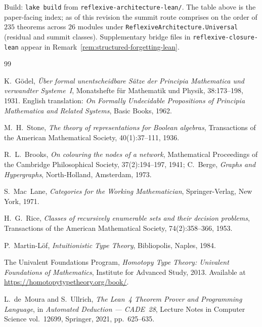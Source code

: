 \documentclass[11pt,a4paper]{article}
\theoremstyle{plain}
\theoremstyle{definition}
\theoremstyle{remark}
\begin{document}
\noindent
Build: \texttt{lake build} from \texttt{reflexive-architecture-lean/}. The table above is the
paper-facing index; as of this revision the summit route comprises on the order of $235$ theorems
across $26$ modules under \texttt{ReflexiveArchitecture.Universal} (residual and summit classes).
Supplementary bridge files in \texttt{reflexive-closure-lean} appear in Remark~\ref{rem:structured-forgetting-lean}.

\begin{thebibliography}{99}


K.~Gödel,
\emph{Über formal unentscheidbare Sätze der Principia Mathematica und
verwandter Systeme~I},
Monatshefte für Mathematik und Physik, 38:173--198, 1931.
English translation: \emph{On Formally Undecidable Propositions of
Principia Mathematica and Related Systems}, Basic Books, 1962.

M.~H.~Stone,
\emph{The theory of representations for Boolean algebras},
Transactions of the American Mathematical Society, 40(1):37--111, 1936.

R.~L.~Brooks,
\emph{On colouring the nodes of a network},
Mathematical Proceedings of the Cambridge Philosophical Society,
37(2):194--197, 1941;
C.~Berge,
\emph{Graphs and Hypergraphs},
North-Holland, Amsterdam, 1973.

S.~Mac~Lane,
\emph{Categories for the Working Mathematician},
Springer-Verlag, New York, 1971.

H.~G.~Rice,
\emph{Classes of recursively enumerable sets and their decision problems},
Transactions of the American Mathematical Society, 74(2):358--366, 1953.

P.~Martin-Löf,
\emph{Intuitionistic Type Theory},
Bibliopolis, Naples, 1984.

The Univalent Foundations Program,
\emph{Homotopy Type Theory: Univalent Foundations of Mathematics},
Institute for Advanced Study, 2013.
Available at \url{https://homotopytypetheory.org/book/}.

L.~de~Moura and S.~Ullrich,
\emph{The Lean~4 Theorem Prover and Programming Language},
in \emph{Automated Deduction --- CADE~28}, Lecture Notes in Computer Science
vol.~12699, Springer, 2021, pp.~625--635.


\end{thebibliography}
\end{document}
